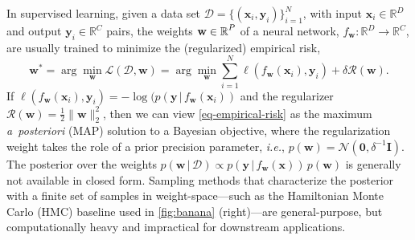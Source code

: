 \documentclass{article}
\makeatletter
\newcommand{\ie}{\textit{i.e.\@}\xspace}
\newcommand{\dataset}{\ensuremath{\mathcal{D}}}
\newcommand{\inputDomain}{\ensuremath{\mathbb{R}^{D}}}
\newcommand{\outputDomain}{\ensuremath{\mathbb{R}^{C}}}
\newcommand{\weights}{\ensuremath{\mathbf{w}}}
\newcommand{\mbf}[1]{\mathbf{#1}}
\renewcommand{\mid}{\,|\,}
\newcommand{\MI}{\mbf{I}}
\newcommand{\vzeros}{\mbf{0}}
\newcommand{\vx}{\mbf{x}}
\newcommand{\vy}{\mbf{y}}
\newcommand{\vw}{\mbf{w}}
\newcommand{\Norm}{\mathcal{N}}
\makeatother
\begin{document}
%
In supervised learning, given a data set $\dataset = \{(\vx_{i} , \vy_{i})\}_{i=1}^{N}$, with input $\vx_i \in \inputDomain$ and output $\vy_i \in \outputDomain$ pairs, the weights $\weights \in \R^{P}$ of a neural network, $f_\mathbf{w} : \inputDomain \to \outputDomain$, are usually trained to minimize the (regularized) empirical risk,
%
\begin{equation} \label{eq-empirical-risk}
  \weights^{*} = 
  \arg \min_{\weights} \mathcal{L}(\dataset,\weights) =
  \arg \min_{\weights} \textstyle\sum_{i=1}^{N} \ell(f_\weights(\mathbf{x}_{i}), \mathbf{y}_i) + \delta \mathcal{R}(\weights).
\end{equation}
%
If $\ell(f_\weights(\vx_{i}), \vy_i) = -\log(p(\vy \mid f_\weights(\vx_{i}))$ and the regularizer $\mathcal{R}(\weights) = \frac{1}{2}\|\weights\|^{2}_2$, then we can view \cref{eq-empirical-risk} as the maximum {\it a~posteriori} (MAP) solution to a Bayesian objective, where the regularization weight takes the role of a prior precision parameter, \ie, $p(\vw) = \Norm(\vzeros, \delta^{-1} \MI)$.
The posterior over the weights ${p(\vw \mid \dataset) \propto p(\vy \mid f_{\weights}(\vx)) \, p(\weights)}$ is generally not available in closed form. Sampling methods that characterize the posterior with a finite set of samples in weight-space---such as the Hamiltonian Monte Carlo (HMC) baseline used in \cref{fig:banana} (right)---are general-purpose, but computationally heavy and impractical for downstream applications.
\end{document}
